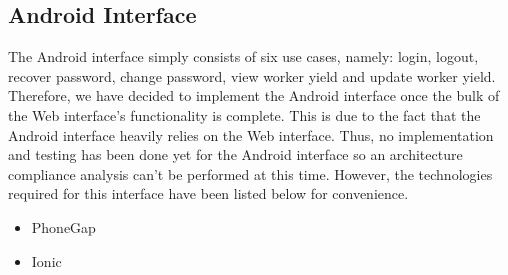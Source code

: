 \documentclass[11pt,fleqn]{book} %
\begin{document}
		\subsection{Android Interface}
		The Android interface simply consists of six use cases, namely: login, logout, recover password, change password, view worker yield and update worker yield. Therefore, we have decided to implement the Android interface once the bulk of the Web interface's functionality is complete. This is due to the fact that the Android interface heavily relies on the Web interface. Thus, no implementation and testing has been done yet for the Android interface so an architecture compliance analysis can't be performed at this time. However, the technologies required for this interface have been listed below for convenience.
			\begin{itemize}
				\item{PhoneGap}				
				\item{Ionic}
			\end{itemize}
\end{document}
